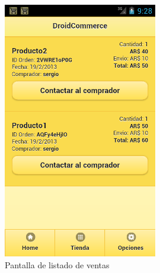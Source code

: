 \begin{figure}
  \centering
    \includegraphics[width=0.6\textwidth]{imagenes/capturas/listado-ventas.png}
        \caption{Pantalla de listado de ventas}
    \label{fig:listado-ventas}
\end{figure}